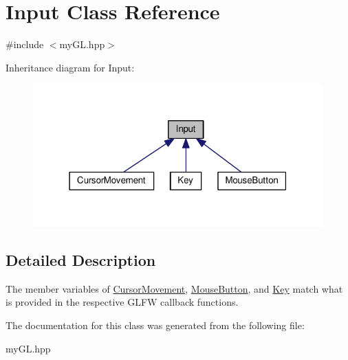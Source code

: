 \hypertarget{classInput}{}\section{Input Class Reference}
\label{classInput}


{\ttfamily \#include $<$my\+G\+L.\+hpp$>$}



Inheritance diagram for Input\+:
\nopagebreak
\begin{figure}[H]
\begin{center}
\leavevmode
\includegraphics[width=316pt]{classInput__inherit__graph}
\end{center}
\end{figure}


\subsection{Detailed Description}
The member variables of \hyperlink{classCursorMovement}{Cursor\+Movement}, \hyperlink{classMouseButton}{Mouse\+Button}, and \hyperlink{classKey}{Key} match what is provided in the respective G\+L\+F\+W callback functions. 

The documentation for this class was generated from the following file\+:\begin{DoxyCompactItemize}
\item 
my\+G\+L.\+hpp\end{DoxyCompactItemize}
